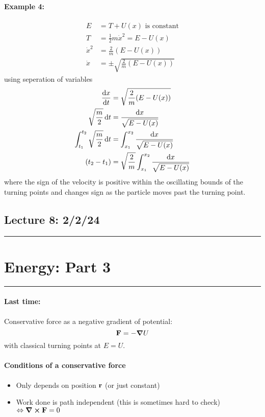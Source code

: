 \documentclass[../main.tex]{subfiles}
\begin{document}
\paragraph{Example 4:}
\begin{align*}
    E &= T + U(x) \textrm{ is constant} \\
    T &= \frac{1}{2} m \dot{x}^2  = E - U(x) \\
    \dot {x}^2 &= \frac{2}{m} (E - U(x)) \\
    \dot{x} &= \pm \sqrt{\frac{2}{m} (E - U(x))}
\end{align*} 
using seperation of variables
\begin{align*}
    \dv{x}{t} &= \sqrt{\frac{2}{m} (E - U(x))} \\
    \sqrt{\frac{m}{2}} \dd{t} &= \frac{\dd{x}}{\sqrt{E - U(x)}} \\
    \int_{t_1}^{t_2} \sqrt{\frac{m}{2}} \dd{t} &= \int_{x_1}^{x_2} \frac{\dd{x}}{\sqrt{E - U(x)}} \\
    (t_2 - t_1) &= \sqrt{\frac{2}{m}} \int_{x_1}^{x_2} \frac{\dd{x}}{\sqrt{E - U(x)}}
\end{align*}
where the sign of the velocity is positive within the oscillating bounds of the turning points and
changes sign as the particle moves past the turning point. 

\pagebreak
\subsection*{Lecture 8: \hfill  2/2/24}
\hrule \vspace{10px}
\section*{Energy: Part 3}
\hrule \vspace{10px}

\paragraph{Last time:} Conservative force as a negative gradient of potential:
\[
    \vb{F} = -\grad U
\]
with classical turning points at $E = U$.

\paragraph{Conditions of a conservative force}
\begin{itemize}
    \item Only depends on position $\vb{r}$ (or just constant)
    \item Work done is path independent (this is sometimes hard to check) $\Leftrightarrow
    \curl{\vb F} = 0$
\end{itemize}
\end{document}
